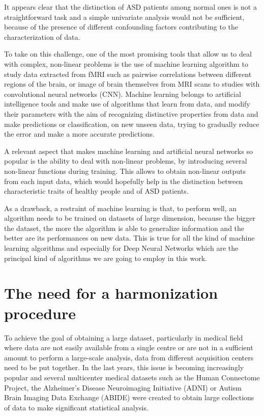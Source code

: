 \documentclass[11pt]{report}
\begin{document}
It appears clear that the distinction of ASD patients among normal ones is not a straightforward task and a simple univariate analysis would not be sufficient, because of the presence of different confounding factors contributing to the characterization of data.

To take on this challenge, one of the most promising tools that allow us to deal with complex, non-linear problems is the use of machine learning algorithm to study data extracted from fMRI such as pairwise correlations between different regions of the brain, or image of brain themselves from MRI scans to studies with convolutional neural networks (CNN).
Machine learning belongs to artificial intelligence tools and make use of algorithms that learn from data, and modify their parameters with the aim of recognizing distinctive properties from data and make predictions or classification, on new unseen data, trying to gradually reduce the error and make a more accurate predictions.

A relevant aspect that makes machine learning and artificial neural networks so popular is the ability to deal with non-linear problems, by introducing several non-linear functions during training.
This allows to obtain non-linear outputs from each input data, which would hopefully help in the distinction between characteristic traits of healthy people and of ASD patients.

As a drawback, a restraint of machine learning is that, to perform well, an algorithm needs to be trained on datasets of large dimension, because the bigger the dataset, the more the algorithm is able to generalize information and the better are its performances on new data.
This is true for all the kind of machine learning algorithms and especially for Deep Neural Networks which are the principal kind of algorithms we are going to employ in this work.

\section{The need for a harmonization procedure}

To achieve the goal of obtaining a large dataset, particularly in medical field where data are not easily available from a single centre or are not in a sufficient amount to perform a large-scale analysis, data from different acquisition centers need to be put together.
In the last years, this issue is becoming increasingly popular and several multicenter medical datasets such as the Human Connectome Project, the Alzheimer’s Disease Neuroimaging Initiative (ADNI) or Autism Brain Imaging Data Exchange (ABIDE) were created to obtain large collections of data to make significant statistical analysis.
\end{document}
